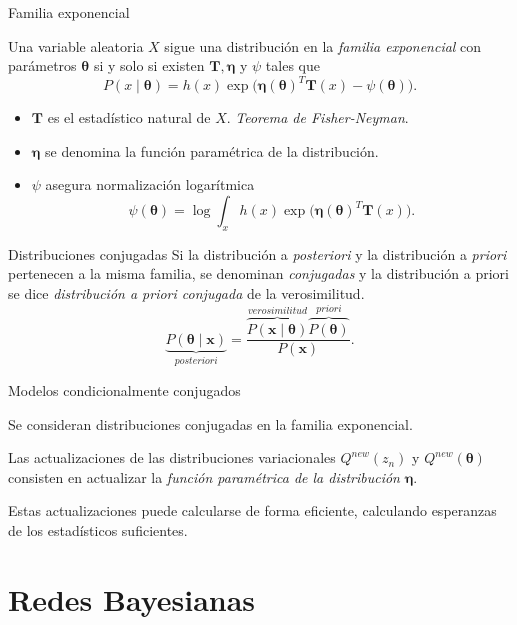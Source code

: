 \documentclass[aspectratio=169]{beamer}
\newcommand{\bx}{\bm{x}}
\newcommand{\btheta}{\bm{\theta}}
\begin{document}
  \begin{frame}{Familia exponencial}
    \begin{shaded}
      Una variable aleatoria \(X\) sigue una distribución en la \emph{familia exponencial} con parámetros \(\btheta\) si y solo si existen \(\bm{T}, \bm{\eta}\) y \(\psi\) tales que
      \[
        P(x \mid \btheta) = h(x) \exp \Big( \bm{\eta}(\btheta)^{T}\bm{T}(x) - \psi(\btheta)\Big).
      \]
    \end{shaded}
    \begin{itemize}
      \item \(\bm{T}\) es el estadístico natural de \(X\). \emph{Teorema de Fisher-Neyman}.
      \item \(\bm{\eta}\) se denomina la función paramétrica de la distribución.
      \item \(\psi\) asegura normalización logarítmica
        \[
        \psi(\btheta) = \log \int_{x} h(x)\exp \Big( \bm{\eta}(\btheta)^{T}\bm{T}(x) \Big).
        \]
    \end{itemize}
  \end{frame}

  \begin{frame}{Distribuciones conjugadas}
    Si la distribución a \emph{posteriori} y la distribución a \emph{priori} pertenecen a la misma familia, se denominan \emph{conjugadas} y la distribución a priori se dice \emph{distribución a priori conjugada} de la verosimilitud.
    \[
      \underbrace{P(\btheta \mid \bx)}_{posteriori} = \frac{\overbrace{P(\bx \mid \btheta)}^{verosimilitud}\overbrace{P(\btheta)}^{priori}}{P(\bx)}.
    \]
  \end{frame}

  \begin{frame}{Modelos condicionalmente conjugados}

    Se consideran distribuciones conjugadas en la familia exponencial.

    Las actualizaciones de las distribuciones variacionales \(Q^{new}(z_{n})\) y \(Q^{new}(\btheta)\) consisten en actualizar la \emph{función paramétrica de la distribución} \(\bm{\eta}\).

    Estas actualizaciones puede calcularse de forma eficiente, calculando esperanzas de los estadísticos suficientes.

  \end{frame}

  \section{Redes Bayesianas}
\end{document}
